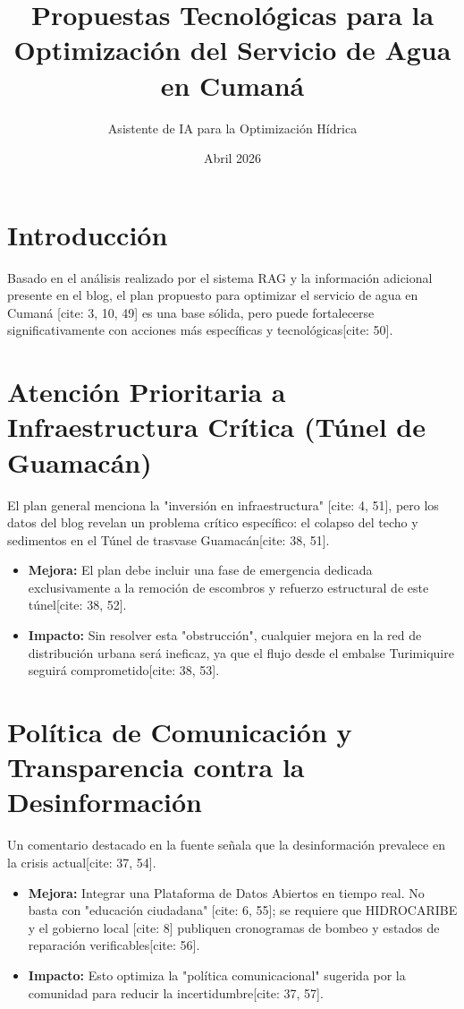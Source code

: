 \documentclass[12pt, a4paper]{article}
\title{Propuestas Tecnológicas para la Optimización del Servicio de Agua en Cumaná}
\author{Asistente de IA para la Optimización Hídrica}
\date{Abril 2026}
\begin{document}
\maketitle

\section*{Introducción}
Basado en el análisis realizado por el sistema RAG y la información adicional presente en el blog, el plan propuesto para optimizar el servicio de agua en Cumaná [cite: 3, 10, 49] es una base sólida, pero puede fortalecerse significativamente con acciones más específicas y tecnológicas[cite: 50].

\section{Atención Prioritaria a Infraestructura Crítica (Túnel de Guamacán)}
El plan general menciona la "inversión en infraestructura" [cite: 4, 51], pero los datos del blog revelan un problema crítico específico: el colapso del techo y sedimentos en el Túnel de trasvase Guamacán[cite: 38, 51].

\begin{itemize}
    \item \textbf{Mejora:} El plan debe incluir una fase de emergencia dedicada exclusivamente a la remoción de escombros y refuerzo estructural de este túnel[cite: 38, 52].
    \item \textbf{Impacto:} Sin resolver esta "obstrucción", cualquier mejora en la red de distribución urbana será ineficaz, ya que el flujo desde el embalse Turimiquire seguirá comprometido[cite: 38, 53].
\end{itemize}

\section{Política de Comunicación y Transparencia contra la Desinformación}
Un comentario destacado en la fuente señala que la desinformación prevalece en la crisis actual[cite: 37, 54].

\begin{itemize}
    \item \textbf{Mejora:} Integrar una Plataforma de Datos Abiertos en tiempo real. No basta con "educación ciudadana" [cite: 6, 55]; se requiere que HIDROCARIBE y el gobierno local [cite: 8] publiquen cronogramas de bombeo y estados de reparación verificables[cite: 56].
    \item \textbf{Impacto:} Esto optimiza la "política comunicacional" sugerida por la comunidad para reducir la incertidumbre[cite: 37, 57].
\end{itemize}
\end{document}
